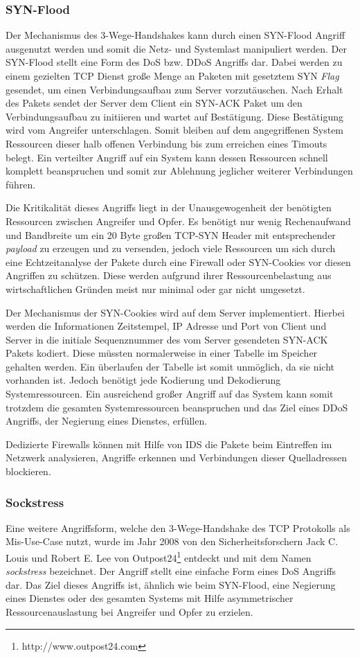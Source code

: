 \subsubsection{SYN-Flood}
Der Mechanismus des 3-Wege-Handshakes kann durch einen SYN-Flood Angriff ausgenutzt werden und somit die Netz- und Systemlast manipuliert werden. Der SYN-Flood stellt eine Form des \ac{DoS} bzw. \ac{DDoS} Angriffs dar. Dabei werden zu einem gezielten \ac{TCP} Dienst große Menge an Paketen mit gesetztem SYN \textit{Flag} gesendet, um einen Verbindungsaufbau zum Server vorzutäuschen. Nach Erhalt des Pakets sendet der Server dem Client ein SYN-ACK Paket um den Verbindungsaufbau zu initiieren und wartet auf Bestätigung. Diese Bestätigung wird vom Angreifer unterschlagen. Somit bleiben auf dem angegriffenen System Ressourcen dieser halb offenen Verbindung bis zum erreichen eines Timouts belegt. Ein verteilter Angriff auf ein System kann dessen Ressourcen schnell komplett beanspruchen und somit zur Ablehnung jeglicher weiterer Verbindungen führen.

Die Kritikalität dieses Angriffs liegt in der Unausgewogenheit der benötigten Ressourcen zwischen Angreifer und Opfer. Es benötigt nur wenig Rechenaufwand und Bandbreite um ein 20 Byte großen \ac{TCP}-SYN Header mit entsprechender \textit{payload} zu erzeugen und zu versenden, jedoch viele Ressourcen um sich durch eine Echtzeitanalyse der Pakete durch eine Firewall oder SYN-Cookies vor diesen Angriffen zu schützen. Diese werden aufgrund ihrer Ressourcenbelastung aus wirtschaftlichen Gründen meist nur minimal oder gar nicht umgesetzt.

Der Mechanismus der SYN-Cookies wird auf dem Server implementiert. Hierbei werden die Informationen Zeitstempel, \ac{IP} Adresse und Port von Client und Server in die initiale Sequenznummer des vom Server gesendeten SYN-ACK Pakets kodiert. Diese müssten normalerweise in einer Tabelle im Speicher gehalten werden. Ein überlaufen der Tabelle ist somit unmöglich, da sie nicht vorhanden ist. Jedoch benötigt jede Kodierung und Dekodierung Systemressourcen. Ein ausreichend großer Angriff auf das System kann somit trotzdem die gesamten Systemressourcen beanspruchen und das Ziel eines \ac{DDoS} Angriffs, der Negierung eines Dienstes, erfüllen.

Dedizierte Firewalls können mit Hilfe von \ac{IDS} die Pakete beim Eintreffen im Netzwerk analysieren, Angriffe erkennen und Verbindungen dieser Quelladressen blockieren.

\subsubsection{Sockstress}
Eine weitere Angriffsform, welche den 3-Wege-Handshake des \ac{TCP} Protokolls als Mis-Use-Case nutzt, wurde im Jahr 2008 von den Sicherheitsforschern Jack C. Louis und Robert E. Lee von Outpost24\footnote{http://www.outpost24.com} entdeckt und mit dem Namen \textit{sockstress} bezeichnet. Der Angriff stellt eine einfache Form eines \ac{DoS} Angriffs dar. Das Ziel dieses Angriffs ist, ähnlich wie beim SYN-Flood, eine Negierung eines Dienstes oder des gesamten Systems mit Hilfe asymmetrischer Ressourcenauslastung bei Angreifer und Opfer zu erzielen.

